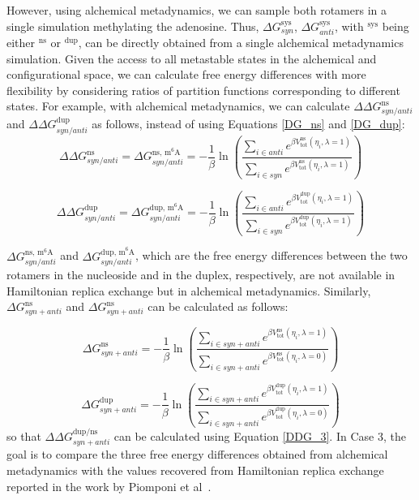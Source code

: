 \documentclass[journal=jacsat,manuscript=article]{achemso}
\begin{document}
However, using alchemical metadynamics, we can sample both rotamers in a single simulation methylating the adenosine. Thus, $\Delta G^{\text{sys}}_{syn}$, $\Delta G^{\text{sys}}_{anti}$, with $^\text{sys}$ being either $^\text{ns}$ or $^\text{dup}$, can be directly obtained from a single alchemical metadynamics simulation. Given the access to all metastable states in the alchemical and configurational space, we can calculate free energy differences with more flexibility by considering ratios of partition functions corresponding to different states. For example, with alchemical metadynamics, we can calculate $\Delta \Delta G^{\text{ns}}_{syn/anti}$ and $\Delta \Delta G^{\text{dup}}_{syn/anti}$ as follows, instead of using Equations \ref{DG_ns} and \ref{DG_dup}:
\begin{equation}
    \Delta \Delta G^{\text{ns}}_{syn/anti} = \Delta G^{\text{ns, m}^6{\text{A}}}_{syn/anti} = -\frac{1}{\beta} \ln \left( \frac{\sum_{i \in anti} e^{\beta V^{\text{ns}}_{\text{tot}}(\eta_i, \lambda=1) }}{\sum_{i \in syn} e^{\beta V^{\text{ns}}_{\text{tot}}(\eta_i, \lambda=1)}}\right)
\end{equation}

\begin{equation}
    \Delta \Delta G^{\text{dup}}_{syn/anti} = \Delta G^{\text{dup, m}^6{\text{A}}}_{syn/anti} = -\frac{1}{\beta} \ln \left( \frac{\sum_{i \in anti} e^{\beta V^{\text{dup}}_{\text{tot}}(\eta_i, \lambda=1) }}{\sum_{i \in syn} e^{\beta V^{\text{dup}}_{\text{tot}}(\eta_i, \lambda=1)}}\right )
\end{equation}

$\Delta G^{\text{ns, m}^6{\text{A}}}_{syn/anti}$ and $\Delta G^{\text{dup, m}^6{\text{A}}}_{syn/anti}$, which are the free energy differences between the two rotamers in the nucleoside and in the duplex, respectively, are not available in Hamiltonian replica exchange but in alchemical metadynamics. Similarly, $\Delta G^{\text{ns}}_{syn + anti}$ and $\Delta G^{\text{ns}}_{syn + anti}$ can be calculated as follows:

\begin{equation}
    \Delta G^{\text{ns}}_{syn + anti} = -\frac{1}{\beta} \ln \left( \frac{\sum_{i \in syn+anti} e^{\beta V^{\text{ns}}_{\text{tot}}(\eta_i, \lambda=1) }}{\sum_{i \in syn+anti} e^{\beta V^{\text{ns}}_{\text{tot}}(\eta_i, \lambda=0)}}\right )
\end{equation}

\begin{equation}
    \Delta G^{\text{dup}}_{syn + anti} = -\frac{1}{\beta} \ln \left( \frac{\sum_{i \in syn+anti} e^{\beta V^{\text{dup}}_{\text{tot}}(\eta_i, \lambda=1) }}{\sum_{i \in syn+anti} e^{\beta V^{\text{dup}}_{\text{tot}}(\eta_i, \lambda=0)}}\right )
\end{equation}
so that $\Delta \Delta G^\text{dup/ns}_{syn + anti}$ can be calculated using Equation \ref{DDG_3}. In Case 3, the goal is to compare the three free energy differences obtained from alchemical metadynamics with the values recovered from Hamiltonian replica exchange reported in the work by Piomponi et al~\cite{piomponi2022molecular}.
\end{document}
